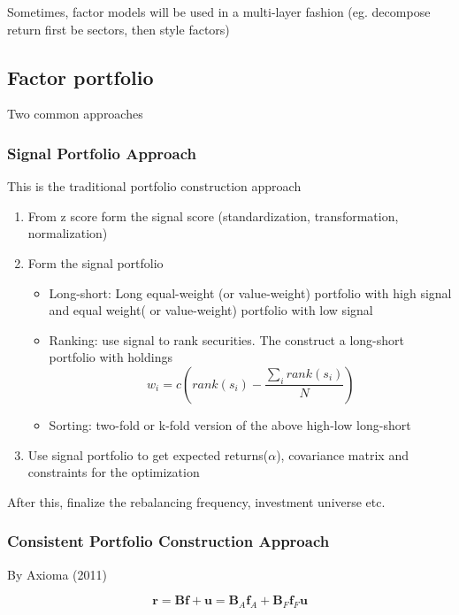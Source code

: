 \documentclass[11pt, openany]{book}              %
\begin{document}
Sometimes, factor models will be used in a multi-layer fashion (eg. decompose return first be sectors, then style factors)

\subsection{Factor portfolio}

Two common approaches

\subsubsection{Signal Portfolio Approach}

This is the traditional portfolio construction approach

\begin{enumerate}
	\item From z score form the signal score (standardization, transformation, normalization)
	\item Form the signal portfolio
	\begin{itemize}
		\item Long-short: Long equal-weight (or value-weight) portfolio with high signal and equal weight( or value-weight) portfolio with low signal
		\item Ranking: use signal to rank securities. The construct a long-short portfolio with holdings
		$$ w_i = c (rank(s_i) - \frac{\sum_i rank(s_i)}{N})$$
		\item Sorting: two-fold or k-fold version of the above high-low long-short
	\end{itemize}
	\item Use signal portfolio to get expected returns($\alpha$), covariance matrix and constraints for the optimization
\end{enumerate}

After this, finalize the rebalancing frequency, investment universe etc.

\subsubsection{Consistent Portfolio Construction Approach}

By Axioma (2011)

$$\mathbf{r} = \mathbf{Bf} + \mathbf{u} = \mathbf{B}_A\mathbf{f}_A + \mathbf{B}_F\mathbf{f}_F\mathbf{u} $$
\end{document}
